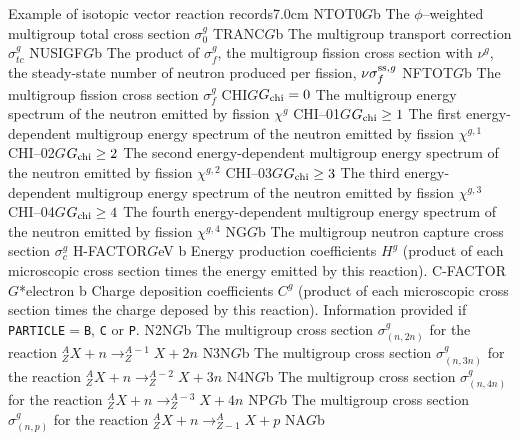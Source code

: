 \begin{DescriptionEnregistrement}{Example of isotopic vector reaction records}{7.0cm}
\label{tabl:tabiso4}
\RealEnr
  {NTOT0}{$G$}{b}
  {The $\phi$--weighted multigroup total cross section $\sigma_0^{g}$}
\RealEnr
  {TRANC}{$G$}{b} 
  {The multigroup transport correction $\sigma_{tc}^{g}$}
\RealEnr
  {NUSIGF}{$G$}{b} 
  {The product of $\sigma_{f}^{g}$, the multigroup fission cross section with
   $\nu^{g}$, the steady-state number of neutron produced per fission,
   $\nu\sigma_{f}^{{\rm ss},g}$}
\RealEnr
  {NFTOT}{$G$}{b}
  {The multigroup fission cross section $\sigma_{f}^{g}$}
\OptRealEnr
  {CHI}{$G$}{$G_{\rm chi}=0$}{}
  {The multigroup energy spectrum of the neutron emitted by fission $\chi^{g}$}
\OptRealEnr
  {CHI--01}{$G$}{$G_{\rm chi}\ge 1$}{}
  {The first energy-dependent multigroup energy spectrum of the neutron emitted by fission $\chi^{g,1}$}
\OptRealEnr
  {CHI--02}{$G$}{$G_{\rm chi}\ge 2$}{}
  {The second energy-dependent multigroup energy spectrum of the neutron emitted by fission $\chi^{g,2}$}
\OptRealEnr
  {CHI--03}{$G$}{$G_{\rm chi}\ge 3$}{}
  {The third energy-dependent multigroup energy spectrum of the neutron emitted by fission $\chi^{g,3}$}
\OptRealEnr
  {CHI--04}{$G$}{$G_{\rm chi}\ge 4$}{}
  {The fourth energy-dependent multigroup energy spectrum of the neutron emitted by fission $\chi^{g,4}$}
\RealEnr
  {NG}{$G$}{b} 
  {The multigroup neutron capture cross section $\sigma_{c}^{g}$}
\RealEnr
  {H-FACTOR}{$G$}{eV b}
  {Energy production coefficients $H^{g}$ (product of each microscopic cross section
  times the energy emitted by this reaction).}
\OptRealEnr
  {C-FACTOR}{$G$}{*}{electron b}
  {Charge deposition coefficients $C^{g}$ (product of each microscopic cross section
  times the charge deposed by this reaction). Information provided if {\tt PARTICLE}$=${\tt B}, {\tt C} or {\tt P}.}
\RealEnr
  {N2N}{$G$}{b} 
  {The multigroup cross section
   $\sigma_{(n,2n)}^{g}$ for the reaction 
   $^{A}_{Z}X+n \to ^{A-1}_{Z}X+2n$}
\RealEnr
  {N3N}{$G$}{b} 
  {The multigroup cross section
   $\sigma_{(n,3n)}^{g}$ for the reaction 
   $^{A}_{Z}X+n \to ^{A-2}_{Z}X+3n$}
\RealEnr
  {N4N}{$G$}{b} 
  {The multigroup cross section
   $\sigma_{(n,4n)}^{g}$ for the reaction 
   $^{A}_{Z}X+n \to ^{A-3}_{Z}X+4n$}
\RealEnr
  {NP}{$G$}{b}
  {The multigroup cross section
   $\sigma_{(n,p)}^{g}$ for the reaction 
   $^{A}_{Z}X+n \to ^{A}_{Z-1}X+p$}
\RealEnr
  {NA}{$G$}{b}

\end{DescriptionEnregistrement}
